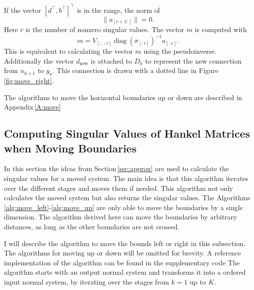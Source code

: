 \documentclass[numbers=noenddot,doctype=mastersthesis,BCOR=15mm,biblatex]{ldvbook}%
\DeclareMathOperator{\diag}{diag}
\newcommand{\m}{\triangledown} %
\begin{document}
If the vector $[d^\top,b^\top]^\top$ is in the range, the norm of 
\begin{equation}
	\|a_{[r+1:]} \| = 0
	.
\end{equation}
Here $r$ is the number of nonzero singular values.
The vector $m$ is computed with 
\begin{equation}
	m = V_{[:,:r]} \diag(\sigma_{[:r]})^{-1} a_{[:r]}
	.
\end{equation}
This is equivalent to calculating the vector $m$ using the pseudoinverse.  
Additionally the vector $d_\text{new}$ is attached to $D_k$ to represent the new connection from $u_{k+1}$ to $y_\m$.
This connection is drawn with a dotted line in Figure\,\ref{fig:move_right}.

The algorithms to move the horizontal boundaries up or down are described in Appendix\,\ref{A:move}

\FloatBarrier
\subsection{Computing Singular Values of Hankel Matrices when Moving Boundaries}\label{subsec:move_sig}
In this section the ideas from Section\,\ref{sec:approx} are used to calculate the singular values for a moved system.
The main idea is that this algorithm iterates over the different stages and moves them if needed.
This algorithm not only calculates the moved system but also returns the singular values.
The Algorithms\,\ref{alg:move_left}-\ref{alg:move_up} are only able to move the boundaries by a single dimension.
The algorithm derived here can move the boundaries by arbitrary distances, as long as the other boundaries are not crossed. 


I will describe the algorithm to move the bounds left or right in this subsection. The algorithms for moving up or down will be omitted for brevity.
A reference implementation of the algorithm can be found in the supplementary code 
The algorithm starts with an output normal system and transforms it into a ordered input normal system, by iterating over the stages from $k=1$ up to $K$.
\end{document}
